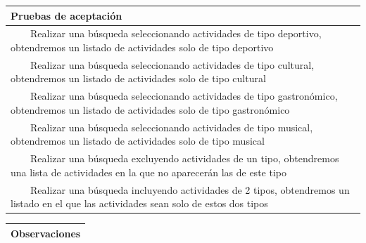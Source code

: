 \documentclass[11pt]{article}
\newcommand{\tabitem}{~~\llap{\textbullet}~~}
\begin{document}
\begin{longtable}{p{1.028\linewidth}}
	\textbf{Pruebas de aceptación}\\
	\midrule
	\tabitem Realizar una búsqueda seleccionando actividades de tipo deportivo, obtendremos un listado de actividades solo de tipo deportivo\\
	\tabitem Realizar una búsqueda seleccionando actividades de tipo cultural, obtendremos un listado de actividades solo de tipo cultural\\
	\tabitem Realizar una búsqueda seleccionando actividades de tipo gastronómico, obtendremos un listado de actividades solo de tipo gastronómico\\
	\tabitem Realizar una búsqueda seleccionando actividades de tipo musical, obtendremos un listado de actividades solo de tipo musical\\
	\tabitem Realizar una búsqueda excluyendo actividades de un tipo, obtendremos una lista de actividades en la que no aparecerán las de este tipo\\
	\tabitem Realizar una búsqueda incluyendo actividades de 2 tipos, obtendremos un listado en el que las actividades sean solo de estos dos tipos\\
\end{longtable}
\begin{longtable}{p{1.028\linewidth}}
	\textbf{Observaciones}\\
	\midrule
	\bottomrule
	\bottomrule
\end{longtable}
\end{document}
